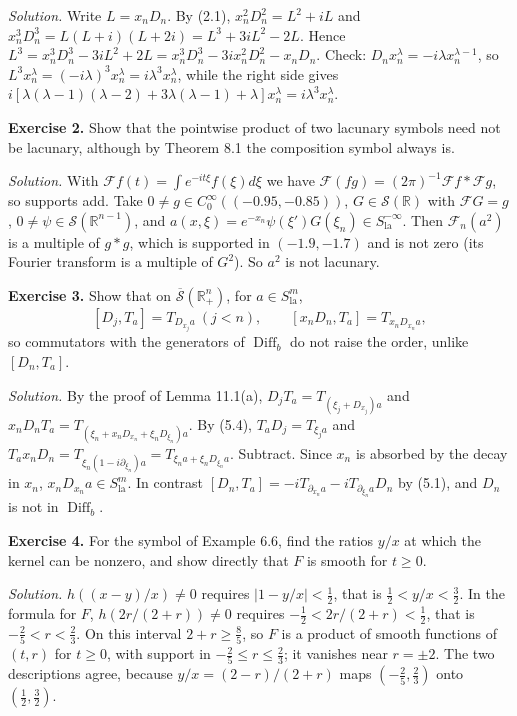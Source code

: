 \documentclass[
  11pt,
]{article}
\begin{document}
\emph{Solution.} Write \(L=x_nD_n\). By (2.1), \(x_n^2D_n^2=L^2+iL\) and
\(x_n^3D_n^3=L(L+i)(L+2i)=L^3+3iL^2-2L\). Hence
\(L^3=x_n^3D_n^3-3iL^2+2L=x_n^3D_n^3-3ix_n^2D_n^2-x_nD_n\). Check:
\(D_nx_n^\lambda=-i\lambda x_n^{\lambda-1}\), so
\(L^3x_n^\lambda=(-i\lambda)^3x_n^\lambda=i\lambda^3x_n^\lambda\), while
the right side gives
\(i[\lambda(\lambda-1)(\lambda-2)+3\lambda(\lambda-1)+\lambda]x_n^\lambda=i\lambda^3x_n^\lambda\).

\textbf{Exercise 2.} Show that the pointwise product of two lacunary
symbols need not be lacunary, although by Theorem 8.1 the composition
symbol always is.

\emph{Solution.} With \(\mathcal Ff(t)=\int e^{-it\xi}f(\xi)d\xi\) we
have \(\mathcal F(fg)=(2\pi)^{-1}\mathcal Ff*\mathcal Fg\), so supports
add. Take \(0\neq g\in C_0^\infty((-0.95,-0.85))\),
\(G\in\mathcal S(\mathbb R)\) with \(\mathcal FG=g\),
\(0\neq\psi\in\mathcal S(\mathbb R^{n-1})\), and
\(a(x,\xi)=e^{-x_n}\psi(\xi')G(\xi_n)\in S^{-\infty}_{\mathrm{la}}\).
Then \(\mathcal F_n(a^2)\) is a multiple of \(g*g\), which is supported
in \((-1.9,-1.7)\) and is not zero (its Fourier transform is a multiple
of \(G^2\)). So \(a^2\) is not lacunary.

\textbf{Exercise 3.} Show that on
\(\overline{\mathcal S}(\mathbb R^n_+)\), for
\(a\in S^m_{\mathrm{la}}\), \[
[D_j,T_a]=T_{D_{x_j}a}\ (j<n),\qquad[x_nD_n,T_a]=T_{x_nD_{x_n}a},
\] so commutators with the generators of \(\operatorname{Diff}_b\) do
not raise the order, unlike \([D_n,T_a]\).

\emph{Solution.} By the proof of Lemma 11.1(a),
\(D_jT_a=T_{(\xi_j+D_{x_j})a}\) and
\(x_nD_nT_a=T_{(\xi_n+x_nD_{x_n}+\xi_nD_{\xi_n})a}\). By (5.4),
\(T_aD_j=T_{\xi_ja}\) and
\(T_ax_nD_n=T_{\xi_n(1-i\partial_{\xi_n})a}=T_{\xi_na+\xi_nD_{\xi_n}a}\).
Subtract. Since \(x_n\) is absorbed by the decay in \(x_n\),
\(x_nD_{x_n}a\in S^m_{\mathrm{la}}\). In contrast
\([D_n,T_a]=-iT_{\partial_{x_n}a}-iT_{\partial_{\xi_n}a}D_n\) by (5.1),
and \(D_n\) is not in \(\operatorname{Diff}_b\).

\textbf{Exercise 4.} For the symbol of Example 6.6, find the ratios
\(y/x\) at which the kernel can be nonzero, and show directly that \(F\)
is smooth for \(t\geq0\).

\emph{Solution.} \(h((x-y)/x)\neq0\) requires \(|1-y/x|<\tfrac12\), that
is \(\tfrac12<y/x<\tfrac32\). In the formula for \(F\),
\(h(2r/(2+r))\neq0\) requires \(-\tfrac12<2r/(2+r)<\tfrac12\), that is
\(-\tfrac25<r<\tfrac23\). On this interval \(2+r\geq\tfrac85\), so \(F\)
is a product of smooth functions of \((t,r)\) for \(t\geq0\), with
support in \(-\tfrac25\leq r\leq\tfrac23\); it vanishes near \(r=\pm2\).
The two descriptions agree, because \(y/x=(2-r)/(2+r)\) maps
\((-\tfrac25,\tfrac23)\) onto \((\tfrac12,\tfrac32)\).
\end{document}
